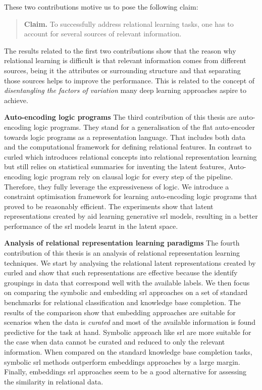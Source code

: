 These two contributions motive us to pose the following claim:

\begin{quote}
	\textbf{Claim.} To successfully address relational learning tasks, one has to account for several sources of relevant information.

\end{quote}


The results related to the first two contributions show that the reason why relational learning is difficult is that relevant information comes from different sources, being it the attributes or surrounding structure and that separating those sources helps to improve the performance.
This is related to the concept of \textit{disentangling the factors of variation} many deep learning approaches aspire to achieve.




\textbf{Auto-encoding logic programs}
The third contribution of this thesis are auto-encoding logic programs.
They stand for a generalisation of the flat auto-encoder towards logic programs as a representation language.
That includes both data and the computational framework for defining relational features.
In contrast to \gls{curled} which introduces relational concepts into relational representation learning but still relies on statistical summaries for inventing the latent features, Auto-encoding logic program rely on clausal logic for every step of the pipeline.
Therefore, they fully leverage the expressiveness of logic.
We introduce a constraint optimisation framework for learning auto-encoding logic programs that proved to be reasonably efficient.
The experiments show that latent representations created by \alp{} aid learning generative \gls{srl} models, resulting in a better performance of the \gls{srl} models learnt in the latent space.







\textbf{Analysis of relational representation learning paradigms}
The fourth contribution of this thesis is an analysis of relational representation learning techniques.
We start by analysing the relational latent representations created by \gls{curled} and show that such representations are effective because the identify groupings in data that correspond well with the available labels.
We then focus on comparing the symbolic and embedding \gls{srl} approaches on a set of standard benchmarks for relational classification and knowledge base completion.
The results of the comparison show that embedding approaches are suitable for scenarios when the data is \textit{curated} and most of the available information is found predictive for the task at hand.
Symbolic approach like \gls{srl} are more suitable for the case when data cannot be curated and reduced to only the relevant information.
When compared on the standard knowledge base completion tasks, symbolic \gls{srl} methods outperform embeddings approaches by a large margin.
Finally, embeddings \gls{srl} approaches seem to be a good alternative for assessing the similarity in relational data.



